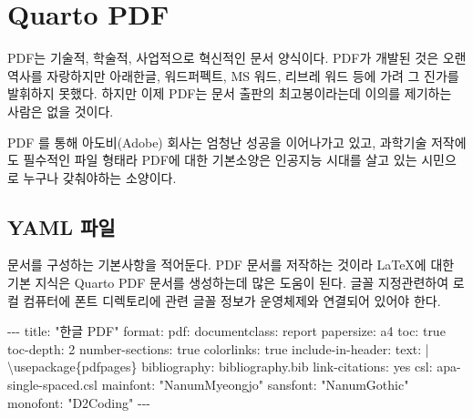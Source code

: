 \documentclass[
  a4paper,
]{report}
\newenvironment{Shaded}{\begin{snugshade}}{\end{snugshade}}
\newcommand{\AttributeTok}[1]{\textcolor[rgb]{0.40,0.45,0.13}{#1}}
\newcommand{\CharTok}[1]{\textcolor[rgb]{0.13,0.47,0.30}{#1}}
\newcommand{\DecValTok}[1]{\textcolor[rgb]{0.68,0.00,0.00}{#1}}
\newcommand{\FunctionTok}[1]{\textcolor[rgb]{0.28,0.35,0.67}{#1}}
\newcommand{\KeywordTok}[1]{\textcolor[rgb]{0.00,0.23,0.31}{#1}}
\newcommand{\NormalTok}[1]{\textcolor[rgb]{0.00,0.23,0.31}{#1}}
\newcommand{\PreprocessorTok}[1]{\textcolor[rgb]{0.68,0.00,0.00}{#1}}
\newcommand{\StringTok}[1]{\textcolor[rgb]{0.13,0.47,0.30}{#1}}
\begin{document}
\hypertarget{quarto-pdf}{%
\chapter{Quarto PDF}\label{quarto-pdf}}

PDF는 기술적, 학술적, 사업적으로 혁신적인 문서 양식이다. PDF가 개발된
것은 오랜 역사를 자랑하지만 아래한글, 워드퍼펙트, MS 워드, 리브레 워드
등에 가려 그 진가를 발휘하지 못했다. 하지만 이제 PDF는 문서 출판의
최고봉이라는데 이의를 제기하는 사람은 없을 것이다.

PDF 를 통해 아도비(Adobe) 회사는 엄청난 성공을 이어나가고 있고, 과학기술
저작에도 필수적인 파일 형태라 PDF에 대한 기본소양은 인공지능 시대를 살고
있는 시민으로 누구나 갖춰야하는 소양이다.

\hypertarget{yaml-uxd30cuxc77c}{%
\section{YAML 파일}\label{yaml-uxd30cuxc77c}}

문서를 구성하는 기본사항을 적어둔다. PDF 문서를 저작하는 것이라
\LaTeX 에 대한 기본 지식은 Quarto PDF 문서를 생성하는데 많은 도움이
된다. 글꼴 지정관련하여 로컬 컴퓨터에 폰트 디렉토리에 관련 글꼴 정보가
운영체제와 연결되어 있어야 한다.

\begin{Shaded}
\begin{Highlighting}[]
\PreprocessorTok{{-}{-}{-}}
\FunctionTok{title}\KeywordTok{:}\AttributeTok{ }\StringTok{"한글 PDF"}
\FunctionTok{format}\KeywordTok{:}\AttributeTok{ }
\AttributeTok{  }\FunctionTok{pdf}\KeywordTok{:}
\AttributeTok{    }\FunctionTok{documentclass}\KeywordTok{:}\AttributeTok{ report}
\AttributeTok{    }\FunctionTok{papersize}\KeywordTok{:}\AttributeTok{ a4}
\AttributeTok{    }\FunctionTok{toc}\KeywordTok{:}\AttributeTok{ }\CharTok{true}
\AttributeTok{    }\FunctionTok{toc{-}depth}\KeywordTok{:}\AttributeTok{ }\DecValTok{2}
\AttributeTok{    }\FunctionTok{number{-}sections}\KeywordTok{:}\AttributeTok{ }\CharTok{true}
\AttributeTok{    }\FunctionTok{colorlinks}\KeywordTok{:}\AttributeTok{ }\CharTok{true}
\AttributeTok{    }\FunctionTok{include{-}in{-}header}\KeywordTok{:}\AttributeTok{ }
\FunctionTok{      text}\KeywordTok{: }\CharTok{|}
\NormalTok{        \textbackslash{}usepackage\{pdfpages\} }
\FunctionTok{bibliography}\KeywordTok{:}\AttributeTok{ bibliography.bib}
\FunctionTok{link{-}citations}\KeywordTok{:}\AttributeTok{ }\CharTok{yes}
\FunctionTok{csl}\KeywordTok{:}\AttributeTok{ apa{-}single{-}spaced.csl}
\FunctionTok{mainfont}\KeywordTok{:}\AttributeTok{ }\StringTok{"NanumMyeongjo"}
\FunctionTok{sansfont}\KeywordTok{:}\AttributeTok{ }\StringTok{"NanumGothic"}
\FunctionTok{monofont}\KeywordTok{:}\AttributeTok{ }\StringTok{"D2Coding"}
\PreprocessorTok{{-}{-}{-}}
\end{Highlighting}
\end{Shaded}
\end{document}
